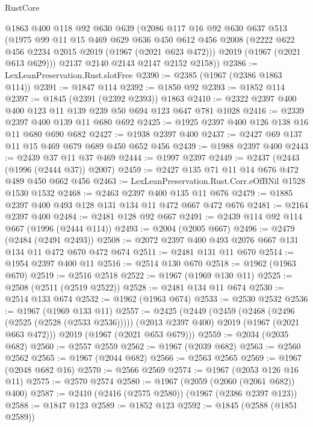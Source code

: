 \begin{lexlean}{RustCore}
\begin{coremodule}
      @1863
      @400
      @118
      @92
      @630
      @639
      (@2086
        @117
        @16
        @92
        @630
        @637
        @513
        (@1975
          @99
          @11
          @15
          @469
          @629
          @636
          @450
          @612
          @456
          @2008
          (@2222 @622 @456 @2234 @2015 @2019 (@1967 (@2021 @623 @472)))
          @2019
          (@1967 (@2021 @613 @629)))
        @2137
        @2140
        @2143
        @2147
        @2152
        @2158))
@2386 := LexLeanPreservation.Rust.slotFree
@2390 := @2385 (@1967 (@2386 @1863 @114))
@2391 := @1847 @114
@2392 := @1850 @92
@2393 := @1852 @114
@2397 := @1845 (@2391 (@2392 @2393)) @1863
@2410 := @2322 @2397 @400 @400 @123 @11 @139 @239 @50 @694 @123 @647 @781 @1028
@2416 := @2339 @2397 @400 @139 @11 @680 @692
@2425 := @1925 @2397 @400 @126 @138 @16 @11 @680 @690 @682
@2427 := @1938 @2397 @400
@2437 := @2427 @69 @137 @11 @15 @469 @679 @689 @450 @652 @456
@2439 := @1988 @2397 @400
@2443 := @2439 @37 @11 @37 @469
@2444 := @1997 @2397
@2449 := @2437 (@2443 (@1996 (@2444 @37)) @2007)
@2459 := @2427 @135 @71 @11 @14 @676 @472 @489 @450 @662 @456
@2463 := LexLeanPreservation.Rust.Corr.eOfBNil @1528 @1530 @1532
@2468 := @2463 @2397 @400 @135 @11 @676
@2479 := @1885 @2397 @400 @493 @128 @131 @134 @11 @472 @667 @472 @676
@2481 := @2164 @2397 @400
@2484 := @2481 @128 @92 @667
@2491 := @2439 @114 @92 @114 @667 (@1996 (@2444 @114))
@2493 := @2004 (@2005 @667)
@2496 := @2479 (@2484 (@2491 @2493))
@2508 := @2072 @2397 @400 @493 @2076 @667 @131 @134 @11 @472 @670 @472 @674
@2511 := @2481 @131 @11 @670
@2514 := @1954 @2397 @400 @11
@2516 := @2514 @130 @670
@2518 := @1962 (@1963 @670)
@2519 := @2516 @2518
@2522 := @1967 (@1969 @130 @11)
@2525 := @2508 (@2511 (@2519 @2522))
@2528 := @2481 @134 @11 @674
@2530 := @2514 @133 @674
@2532 := @1962 (@1963 @674)
@2533 := @2530 @2532
@2536 := @1967 (@1969 @133 @11)
@2557 := @2425
    (@2449
      (@2459
        (@2468 (@2496 (@2525 (@2528 (@2533 @2536)))))
        (@2013 @2397 @400)
        @2019
        (@1967 (@2021 @663 @472)))
      @2019
      (@1967 (@2021 @653 @679)))
@2559 := @2034 (@2035 @682)
@2560 := @2557 @2559
@2562 := @1967 (@2039 @682)
@2563 := @2560 @2562
@2565 := @1967 (@2044 @682)
@2566 := @2563 @2565
@2569 := @1967 (@2048 @682 @16)
@2570 := @2566 @2569
@2574 := @1967 (@2053 @126 @16 @11)
@2575 := @2570 @2574
@2580 := @1967 (@2059 (@2060 (@2061 @682)) @400)
@2587 := @2410 (@2416 (@2575 @2580)) (@1967 (@2386 @2397 @123))
@2588 := @1847 @123
@2589 := @1852 @123
@2592 := @1845 (@2588 (@1851 @2589))

\end{coremodule}
\end{lexlean}
